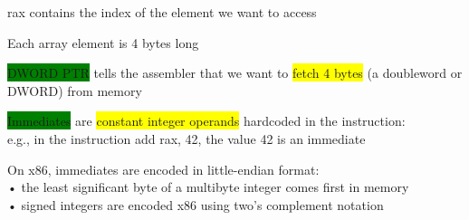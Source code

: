 \documentclass[]{project_plan}
\begin{document}
rax contains the index of the element we want to access

Each array element is 4 bytes long

\colorbox{green}{DWORD PTR} tells the assembler that we want to \colorbox{yellow}{fetch 4 bytes} (a doubleword or DWORD) from
memory

\colorbox{green}{Immediates} are \colorbox{yellow}{constant integer operands} hardcoded in the instruction:\\
e.g., in the instruction add rax, 42, the value 42 is an immediate

On x86, immediates are encoded in little-endian format:\\
• the least significant byte of a multibyte integer comes first in memory\\
• signed integers are encoded x86 using two’s complement notation
\end{document}

